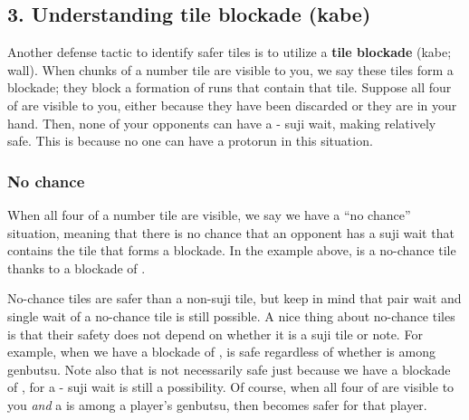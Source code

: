 {{\subsection*{3. Understanding tile blockade ({\jap kabe})} \label{sec:blockade}
Another defense tactic to identify safer tiles is to utilize a {\bf tile blockade} ({\jap kabe}; wall). When chunks of a number tile are visible to you, we say these tiles form a blockade; they block a formation of runs that contain that tile. Suppose all four of {\large{}} are visible to you, either because they have been discarded or they are in your hand.
Then, none of your opponents can have a {\large{}-} {\jap suji} wait, making {\large{}} relatively safe. This is because no one can have a protorun {\large{}} in this situation. 

\subsubsection{No chance}
When all four of a number tile are visible, we say we have a ``no chance'' situation, meaning that there is no chance that an opponent has a {\jap suji} wait that contains the tile that forms a blockade. In the example above, {\large{}} is a no-chance tile thanks to a blockade of {\large{}}. 

\bigskip
No-chance tiles are safer than a non-{\jap suji} tile, but keep in mind that pair wait and single wait of a no-chance tile is still possible. 
A nice thing about no-chance tiles is that their safety does not depend on whether it is a {\jap suji} tile or note. For example, when we have a blockade of {\large{}}, {\large{}} is safe regardless of whether {\large{}} is among {\jap genbutsu}. Note also that {\large{}} is not necessarily safe just because we have a blockade of {\large{}}, for a {\large{}-} {\jap suji} wait is still a possibility. 
Of course, when all four of {\large{}} are visible to you \emph{and} a {\large{}} is among a player's {\jap genbutsu}, then {\large{}} becomes safer for that player. 

}}

